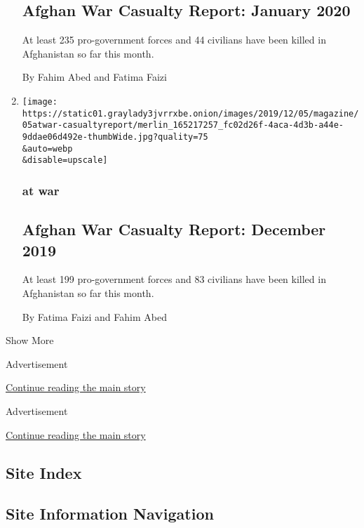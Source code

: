 \begin{enumerate}
  \hypertarget{afghan-war-casualty-report-january-2020}{%
  \subsection{Afghan War Casualty Report: January
  2020}\label{afghan-war-casualty-report-january-2020}}

  At least 235 pro-government forces and 44 civilians have been killed
  in Afghanistan so far this month.

  By Fahim Abed and Fatima Faizi
\item
  \href{/2019/12/05/magazine/afghan-war-casualty-report-december-2019.html}{}

  \texttt{[image: https://static01.graylady3jvrrxbe.onion/images/2019/12/05/magazine/05atwar-casualtyreport/merlin\_165217257\_fc02d26f-4aca-4d3b-a44e-9ddae06d492e-thumbWide.jpg?quality=75\\\&auto=webp\\\&disable=upscale]}

  \hypertarget{at-war-9}{%
  \subsubsection{at war}\label{at-war-9}}

  \hypertarget{afghan-war-casualty-report-december-2019}{%
  \subsection{Afghan War Casualty Report: December
  2019}\label{afghan-war-casualty-report-december-2019}}

  At least 199 pro-government forces and 83 civilians have been killed
  in Afghanistan so far this month.

  By Fatima Faizi and Fahim Abed
\end{enumerate}

Show More

Advertisement

\protect\hyperlink{after-mid1}{Continue reading the main story}

Advertisement

\protect\hyperlink{after-mktg}{Continue reading the main story}

\hypertarget{site-index}{%
\subsection{Site Index}\label{site-index}}

\hypertarget{site-information-navigation}{%
\subsection{Site Information
Navigation}\label{site-information-navigation}}

